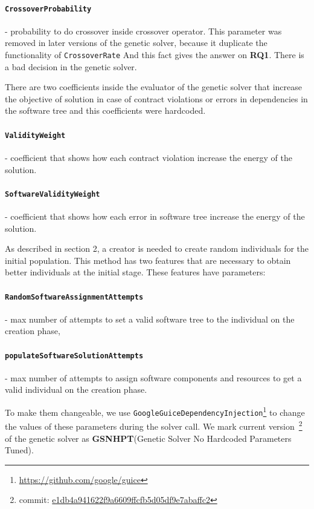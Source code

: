 	 \paragraph{\texttt{CrossoverProbability}} - probability to do crossover inside crossover operator. This parameter was removed in later versions of the genetic solver, because it duplicate the functionality of \texttt{CrossoverRate} And this fact gives the answer on \textbf{RQ1}. There is a bad decision in the genetic solver.
	 
There are two coefficients inside the evaluator of the genetic solver that increase the objective of solution in case of contract violations or errors in dependencies in the software tree and this coefficients were hardcoded.
	 \paragraph{\texttt{ValidityWeight}} - coefficient that shows how each contract violation increase the energy of the solution.
	 \paragraph{\texttt{SoftwareValidityWeight}} - coefficient that shows how each error in software tree increase the energy of the solution.
	 
As described in section 2, a creator is needed to create random individuals for the initial population.
This method has two features that are necessary to obtain better individuals at the initial stage. These features have parameters:
	 \paragraph{\texttt{RandomSoftwareAssignmentAttempts}} - max number of attempts to set a valid software tree to the individual on the creation phase,
	 \paragraph{\texttt{populateSoftwareSolutionAttempts}} -  max number of attempts to assign software components and resources to get a valid individual on the creation phase.

To make them changeable, we use \texttt{GoogleGuiceDependencyInjection}\footnote{\url{https://github.com/google/guice}} to change the values of these parameters during the solver call.
We mark current version~\footnote{commit: \href{https://git-st.inf.tu-dresden.de/mquat/mquat2/commit/e1db4a941622f9a6609ffcfb5d05df9e7abaffc2}{e1db4a941622f9a6609ffcfb5d05df9e7abaffc2}} of the genetic solver as \textbf{GSNHPT}(Genetic Solver No Hardcoded Parameters Tuned).

